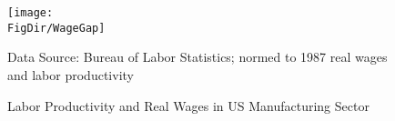 \begin{figure}[ht]
  \centerline{
    \texttt{[image: \\FigDir/WageGap]}
  }
  \caption{Labor Productivity and Real Wages in US Manufacturing Sector} \label{fig:WageGap}
  \footnotesize{Data Source: Bureau of Labor Statistics; normed to 1987 real wages and labor productivity}
\end{figure}
